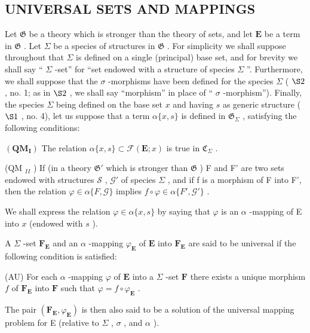 \subsection{UNIVERSAL SETS AND MAPPINGS}

Let \(\mathfrak{G}\) be a theory which is stronger than the theory of sets, and let \(\mathbf{E}\) be a term in \(\mathfrak{G}\) . Let \(\Sigma\) be a species of structures in \(\mathfrak{G}\) . For simplicity we shall suppose throughout that \(\Sigma\) is defined on a single (principal) base set, and for brevity we shall say `` \(\Sigma\) -set'' for ``set endowed with a structure of species \(\Sigma\) ''. Furthermore, we shall suppose that the \(\sigma\) -morphisms have been defined for the species \(\Sigma\) ( \(\S 2\) , no. 1; as in \(\S 2\) , we shall say ``morphism'' in place of `` \(\sigma\) -morphism''). Finally, the species \(\Sigma\) being defined on the base set \(x\) and having \(s\) as generic structure ( \(\S 1\) , no. 4), let us suppose that a term \(\alpha \{x, s\}\) is defined in \(\mathfrak{G}_{\Sigma}\) , satisfying the following conditions:

\((\mathbf{Q}\mathbf{M}_{\mathbf{I}})\) The relation \(\alpha \{x,s\} \subset \mathcal{F}(\mathbf{E};x)\) is true in \(\mathfrak{C}_{\Sigma}\) .

(QM \(_{II}\) ) If (in a theory \(\mathfrak{G}'\) which is stronger than \(\mathfrak{G}\) ) F and F' are two sets endowed with structures \(\mathscr{S}\) , \(\mathscr{G}'\) of species \(\Sigma\) , and if f is a morphism of F into F', then the relation \(\varphi \in \alpha \{F, \mathscr{G}\}\) implies \(f \circ \varphi \in \alpha \{F', \mathscr{G}'\}\) .

We shall express the relation \(\varphi\in\alpha\{x,s\}\) by saying that \(\varphi\) is an \(\alpha\) -mapping of E into \(x\) (endowed with \(s\) ).

A \(\Sigma\) -set \(\mathbf{F}_{\mathbf{E}}\) and an \(\alpha\) -mapping \(\varphi_{\mathbf{E}}\) of \(\mathbf{E}\) into \(\mathbf{F}_{\mathbf{E}}\) are said to be universal if the following condition is satisfied:

(AU) For each \(\alpha\) -mapping \(\varphi\) of \(\mathbf{E}\) into a \(\Sigma\) -set \(\mathbf{F}\) there exists a unique morphism \(f\) of \(\mathbf{F}_{\mathbf{E}}\) into \(\mathbf{F}\) such that \(\varphi = f \circ \varphi_{\mathbf{E}}\) .

The pair \((\mathbf{F}_{\mathbf{E}}, \varphi_{\mathbf{E}})\) is then also said to be a solution of the universal mapping problem for E (relative to \(\Sigma\) , \(\sigma\) , and \(\alpha\) ).

